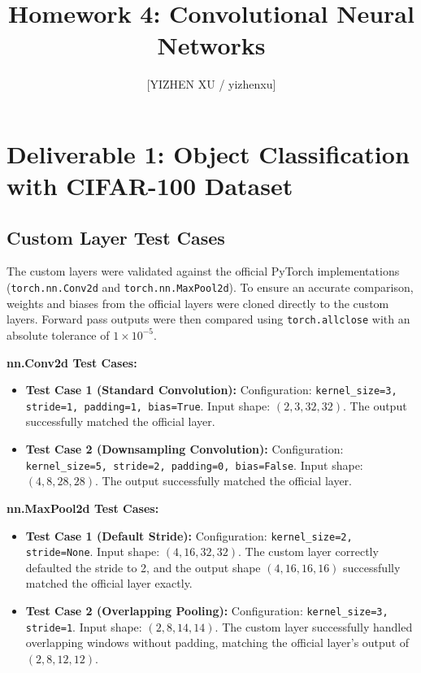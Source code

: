 \documentclass[11pt]{article}
\title{Homework 4: Convolutional Neural Networks}
\author{
    [YIZHEN XU / yizhenxu] \\
}
\begin{document}
\maketitle

\section{Deliverable 1: Object Classification with CIFAR-100 Dataset}

\subsection{Custom Layer Test Cases}

The custom layers were validated against the official PyTorch implementations (\texttt{torch.nn.Conv2d} and \texttt{torch.nn.MaxPool2d}). To ensure an accurate comparison, weights and biases from the official layers were cloned directly to the custom layers. Forward pass outputs were then compared using \texttt{torch.allclose} with an absolute tolerance of $1\times 10^{-5}$.

\textbf{nn.Conv2d Test Cases:}
\begin{itemize}
    \item \textbf{Test Case 1 (Standard Convolution):} 
    Configuration: \texttt{kernel\_size=3, stride=1, padding=1, bias=True}. 
    Input shape: $(2, 3, 32, 32)$. The output successfully matched the official layer.
    
    \item \textbf{Test Case 2 (Downsampling Convolution):} 
    Configuration: \texttt{kernel\_size=5, stride=2, padding=0, bias=False}. 
    Input shape: $(4, 8, 28, 28)$. The output successfully matched the official layer.
\end{itemize}
\textbf{nn.MaxPool2d Test Cases:}
\begin{itemize}
    \item \textbf{Test Case 1 (Default Stride):} 
    Configuration: \texttt{kernel\_size=2, stride=None}. 
    Input shape: $(4, 16, 32, 32)$. The custom layer correctly defaulted the stride to 2, and the output shape $(4, 16, 16, 16)$ successfully matched the official layer exactly.
    
    \item \textbf{Test Case 2 (Overlapping Pooling):} 
    Configuration: \texttt{kernel\_size=3, stride=1}. 
    Input shape: $(2, 8, 14, 14)$. The custom layer successfully handled overlapping windows without padding, matching the official layer's output of $(2, 8, 12, 12)$.
\end{itemize}
\end{document}
